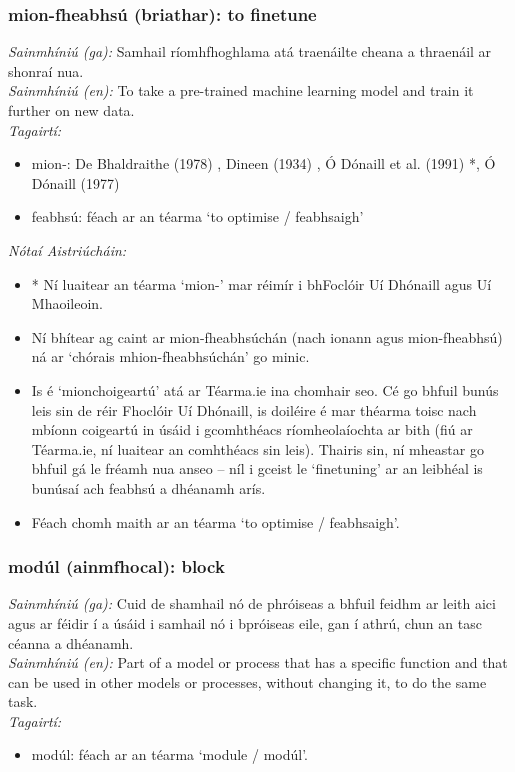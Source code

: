 \subsubsection*{mion-fheabhsú (briathar): to finetune}
 \noindent \textit{Sainmhíniú (ga):} Samhail ríomhfhoghlama atá traenáilte cheana a thraenáil ar shonraí nua.
\\
 \noindent \textit{Sainmhíniú (en):} To take a pre-trained machine learning model and train it further on new data.
\\
 \noindent \textit{Tagairtí:}
\begin{itemize}
	\item mion-: De Bhaldraithe (1978) \cite{de-bhaldraithe}, Dineen (1934) \cite{dineen}, Ó Dónaill et al. (1991) \cite{focloir-beag}*, Ó Dónaill (1977) \cite{odonaill}
	\item feabhsú: féach ar an téarma `to optimise / feabhsaigh'
\end{itemize}

 \noindent \textit{Nótaí Aistriúcháin:}
\begin{itemize}
	\item * Ní luaitear an téarma `mion-' mar réimír i bhFoclóir Uí Dhónaill agus Uí Mhaoileoin.
	\item Ní bhítear ag caint ar mion-fheabhsúchán (nach ionann agus mion-fheabhsú) ná ar `chórais mhion-fheabhsúchán' go minic.
	\item Is é `mionchoigeartú' atá ar Téarma.ie ina chomhair seo. Cé go bhfuil bunús leis sin de réir Fhoclóir Uí Dhónaill, is doiléire é mar théarma toisc nach mbíonn coigeartú in úsáid i gcomhthéacs ríomheolaíochta ar bith (fiú ar Téarma.ie, ní luaitear an comhthéacs sin leis). Thairis sin, ní mheastar go bhfuil gá le fréamh nua anseo -- níl i gceist le `finetuning' ar an leibhéal is bunúsaí ach feabhsú a dhéanamh arís.
	\item Féach chomh maith ar an téarma `to optimise / feabhsaigh'.
\end{itemize}


\subsubsection*{modúl (ainmfhocal): block}
 \noindent \textit{Sainmhíniú (ga):} Cuid de shamhail nó de phróiseas a bhfuil feidhm ar leith aici agus ar féidir í a úsáid i samhail nó i bpróiseas eile, gan í athrú, chun an tasc céanna a dhéanamh.
\\
 \noindent \textit{Sainmhíniú (en):} Part of a model or process that has a specific function and that can be used in other models or processes, without changing it, to do the same task.
\\
 \noindent \textit{Tagairtí:}
\begin{itemize}
	\item modúl: féach ar an téarma `module / modúl'.
\end{itemize}

